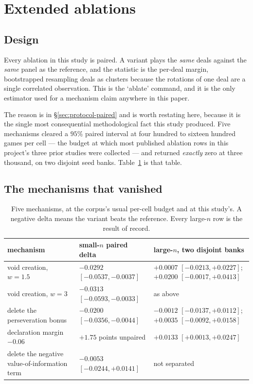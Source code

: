 \section{Extended ablations}
\label{app:ablations}

\subsection{Design}
\label{app:abl-design}

Every ablation in this study is paired. A variant plays the \emph{same} deals against the \emph{same}
panel as the reference, and the statistic is the per-deal margin, bootstrapped resampling deals as
clusters because the rotations of one deal are a single correlated observation. This is the
`ablate' command, and it is the only estimator used for a mechanism claim anywhere in this paper.

The reason is in \S\ref{sec:protocol-paired} and is worth restating here, because it is the single
most consequential methodological fact this study produced. Five mechanisms cleared a $95\%$ paired
interval at four hundred to sixteen hundred games per cell --- the budget at which most published
ablation rows in this project's three prior studies were collected --- and returned \emph{exactly}
zero at three thousand, on two disjoint seed banks. Table~\ref{tab:abl-null} is that table.

\subsection{The mechanisms that vanished}
\label{app:abl-null}

\begin{table}[h]\centering
\caption{Five mechanisms, at the corpus's usual per-cell budget and at this study's. A negative
delta means the variant beats the reference. Every large-$n$ row is the result of record.}
\label{tab:abl-null}
\small
\begin{tabular}{lll}
\toprule
mechanism & small-$n$ paired delta & large-$n$, two disjoint banks \\
\midrule
void creation, $w=1.5$ & $-0.0292$ $[-0.0537, -0.0037]$ & $+0.0007$ $[-0.0213, +0.0227]$; $+0.0200$ $[-0.0017, +0.0413]$ \\
void creation, $w=3$ & $-0.0313$ $[-0.0593, -0.0033]$ & as above \\
delete the perseveration bonus & $-0.0200$ $[-0.0356, -0.0044]$ & $-0.0012$ $[-0.0137, +0.0112]$; $+0.0035$ $[-0.0092, +0.0158]$ \\
declaration margin $-0.06$ & $+1.75$ points unpaired & $+0.0133$ $[+0.0013, +0.0247]$ \\
delete the negative value-of-information term & $-0.0053$ $[-0.0244, +0.0141]$ & not separated \\
\bottomrule
\end{tabular}
\end{table}

